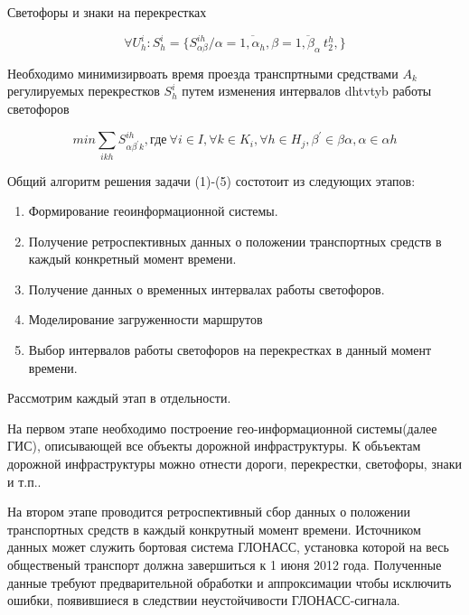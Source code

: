 \documentclass[a4paper,13pt]{article}
\begin{document}
Светофоры и знаки на перекрестках

\begin{equation}\label{eq:crosstime}
\forall U_h^{i} :S^i_{h} = \{ S^{ih}_{\alpha \beta}/\alpha = \overline{1,{\alpha}_h} , \beta = \overline{1,{\beta}_{\alpha}} \ t^h_{2}, \}
\end{equation}

Необходимо минимизирвоать время проезда транспртными средствами \begin{math}A_k\end{math} регулируемых перекрестков \begin{math}S^i_{h}\end{math} путем изменения интервалов dhtvtyb работы светофоров

\begin{equation}\label{eq:crosstimemin}
min \sum_{ikh} S^{ih}_{\alpha \beta^{\prime} k}, \text{где}\ \forall i \in I, \forall k \in K_i, \forall h \in H_j, \beta^{\prime} \in \beta \alpha , \alpha \in \alpha h
\end{equation}

Общий алгоритм решения задачи (1)-(5) состотоит из следующих этапов:
\begin{enumerate}
\item Формирование геоинформационной системы.
\item Получение ретроспективных данных о положении транспортных средств в каждый конкретный момент времени.
\item Получение данных о временных интервалах работы светофоров.
\item Моделирование загруженности маршрутов
\item Выбор интервалов работы светофоров на перекрестках в данный момент времени.
\end{enumerate}

Рассмотрим каждый этап в отдельности.

На первом этапе необходимо построение гео-информационной системы(далее ГИС), описывающей все объекты дорожной инфраструктуры. К обьъектам дорожной инфраструктуры можно отнести дороги, перекрестки, светофоры, знаки и т.п..

На втором этапе проводится ретроспективный сбор данных о положении транспортных средств в каждый конкрутный момент времени. Источником данных может служить бортовая система ГЛОНАСС, установка которой на весь общественый транспорт должна завершиться к 1 июня 2012 года. Полученные данные требуют предварительной обработки и аппроксимации чтобы исключить ошибки, появившиеся в следствии неустойчивости ГЛОНАСС-сигнала.
\end{document}
